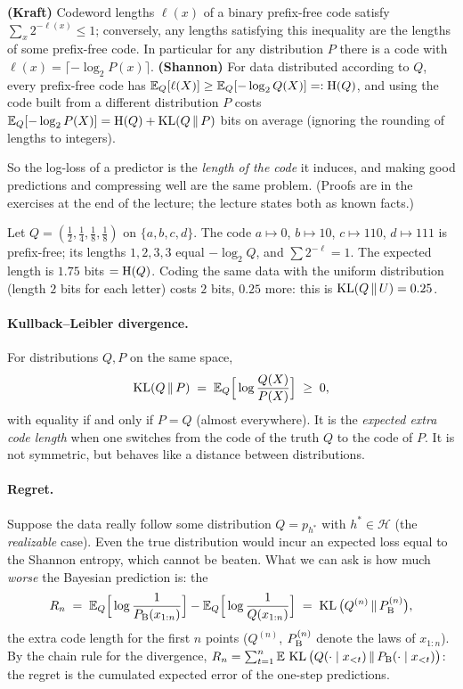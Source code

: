 \begin{thm}\label{thm:kraft}
\textbf{(Kraft)} Codeword lengths $\ell(x)$ of a binary prefix-free code satisfy $\sum_x2^{-\ell(x)}\le1$; conversely, any lengths satisfying this inequality are the lengths of some prefix-free code. In particular for any distribution $P$ there is a code with $\ell(x)=\lceil-\log_2P(x)\rceil$.
\textbf{(Shannon)} For data distributed according to $Q$, every prefix-free code has $\mathbb{E}_Q[\ell(X)]\ge\mathbb{E}_Q[-\log_2Q(X)]=:\mathrm{H}(Q)$, and using the code built from a different distribution $P$ costs $\mathbb{E}_Q[-\log_2P(X)]=\mathrm{H}(Q)+\operatorname{KL}(Q\,\|\,P)$ bits on average (ignoring the rounding of lengths to integers).
\end{thm}
\noindent So the log-loss of a predictor is the \emph{length of the code} it induces, and making good predictions and compressing well are the same problem. (Proofs are in the exercises at the end of the lecture; the lecture states both as known facts.)

\begin{exmp}
Let $Q=(\tfrac12,\tfrac14,\tfrac18,\tfrac18)$ on $\{a,b,c,d\}$. The code $a\mapsto0$, $b\mapsto10$, $c\mapsto110$, $d\mapsto111$ is prefix-free; its lengths $1,2,3,3$ equal $-\log_2Q$, and $\sum2^{-\ell}=1$. The expected length is $1.75$ bits $=\mathrm{H}(Q)$. Coding the same data with the uniform distribution (length $2$ bits for each letter) costs $2$ bits,
$0.25$ more: this is $\operatorname{KL}(Q\,\|\,U)=0.25$.
\end{exmp}

\paragraph{Kullback--Leibler divergence.}
For distributions $Q,P$ on the same space,
\[
   \operatorname{KL}(Q\,\|\,P)\;=\;\mathbb{E}_Q\Big[\log\frac{Q(X)}{P(X)}\Big]\;\ge\;0,
\]
with equality if and only if $P=Q$ (almost everywhere). It is the \emph{expected extra code length} when one switches from the code of the truth $Q$ to the code of $P$. It is not symmetric, but behaves like a distance between distributions.

\paragraph{Regret.}
Suppose the data really follow some distribution $Q=p_{h^*}$ with $h^*\in\mathcal H$ (the \emph{realizable} case). Even the true distribution would incur an expected loss equal to the Shannon entropy, which cannot be beaten. What we can ask is how much \emph{worse} the Bayesian prediction is: the 
\begin{equation}\label{eq:regret}
   R_n\;=\;\mathbb{E}_{Q}\Big[\log\frac{1}{P_{\mathrm{B}}(x_{1:n})}\Big]-\mathbb{E}_{Q}\Big[\log\frac{1}{Q(x_{1:n})}\Big]\;=\;\operatorname{KL}\big(Q^{(n)}\,\|\,P_{\mathrm{B}}^{(n)}\big),
\end{equation}
the extra code length for the first $n$ points ($Q^{(n)}$, $P_{\mathrm{B}}^{(n)}$ denote the laws of $x_{1:n}$). By the chain rule for the divergence, $R_n=\sum_{t=1}^n\mathbb{E}\,\operatorname{KL}\big(Q(\cdot\mid x_{<t})\,\|\,P_{\mathrm{B}}(\cdot\mid x_{<t})\big)$: the regret is the cumulated expected error of the one-step predictions.

